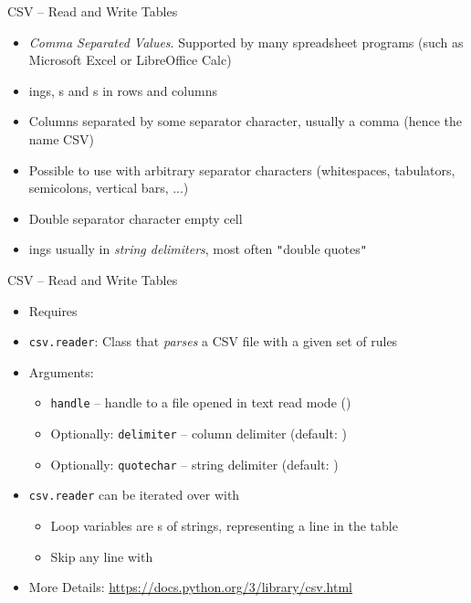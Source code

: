 
\begin{frame}[fragile]{CSV -- Read and Write Tables}
%
\begin{itemize}
\item \emph{Comma Separated Values}. Supported by many spreadsheet programs (such as Microsoft Excel or LibreOffice Calc)
\item {}ings, s and s in rows and columns
\item Columns separated by some separator character, usually a comma (hence the name CSV)
\item Possible to use with arbitrary separator characters (\eg whitespaces, tabulators, semicolons, vertical bars, ...)
\item Double separator character \Thus empty cell
\item {}ings usually in \emph{string delimiters}, most often  \texttt{"}double quotes\texttt{"}
\end{itemize}
%
\end{frame}


\begin{frame}[fragile]{CSV -- Read and Write Tables}
%
\begin{itemize}
\item Requires 
\item \texttt{csv.reader}: Class that \emph{parses} a CSV file with a given set of rules
\item Arguments:
	\begin{itemize}
	\item \texttt{handle} -- handle to a file opened in text read mode ()
	\item Optionally: \texttt{delimiter} -- column delimiter (default: )
	\item Optionally: \texttt{quotechar} -- string delimiter (default: )
	\end{itemize}
\item \texttt{csv.reader} can be iterated over with 
	\begin{itemize}
	\item Loop variables are s of strings, representing a line in the table
	\item Skip any line with 
	\end{itemize}
\item More Details: \url{https://docs.python.org/3/library/csv.html}
\end{itemize}
%
\end{frame}

